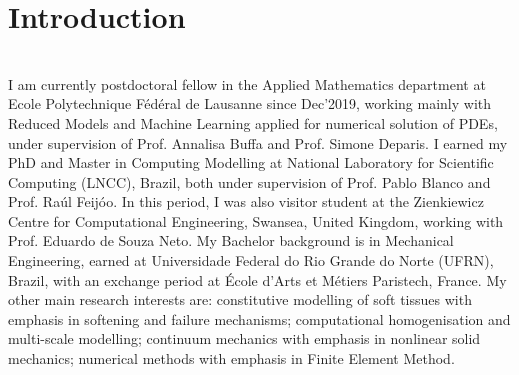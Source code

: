 \documentclass[letterpaper]{twentysecondcv} %
\begin{document}
\section{Introduction} \\
I am currently postdoctoral fellow in the Applied Mathematics department at Ecole Polytechnique Fédéral de Lausanne since Dec'2019, working mainly with Reduced Models and Machine Learning applied for numerical solution of PDEs, under supervision of Prof. Annalisa Buffa and Prof. Simone Deparis. I earned my PhD and Master in Computing Modelling at National Laboratory for Scientific Computing (LNCC), Brazil, both under supervision of Prof. Pablo Blanco and Prof. Raúl Feijóo. In this period, I was also visitor student at the Zienkiewicz Centre for Computational Engineering, Swansea, United Kingdom, working with Prof. Eduardo de Souza Neto. My Bachelor background is in Mechanical Engineering, earned at Universidade Federal do Rio Grande do Norte (UFRN), Brazil, with an exchange period at École d'Arts et Métiers Paristech, France. My other main research interests are: constitutive modelling of soft tissues with emphasis in softening and failure mechanisms; computational homogenisation and multi-scale modelling; continuum mechanics with emphasis in nonlinear solid mechanics; numerical methods with emphasis in Finite Element Method.


\end{document}
